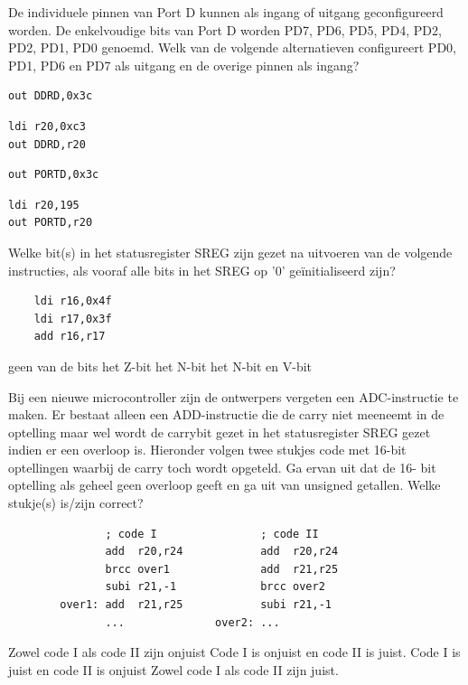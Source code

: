 \documentclass[a4paper,12pt,fleqn,dutch]{tisdexam}
\begin{document}
\begin{questions}
\question
\label{opg:opg5}
De individuele pinnen van Port D kunnen als ingang of uitgang geconfigureerd worden. De
enkelvoudige bits van Port D worden PD7, PD6, PD5, PD4, PD2, PD2, PD1, PD0 genoemd.
Welk van de volgende alternatieven configureert PD0, PD1, PD6 en PD7 als uitgang en de
overige pinnen als ingang?
\begin{choices}
	\choice \begin{verbatim}out DDRD,0x3c\end{verbatim}
	\CorrectChoice \label{ans:opg5} \begin{verbatim}ldi r20,0xc3
out DDRD,r20\end{verbatim}
	\choice \begin{verbatim}out PORTD,0x3c\end{verbatim}
	\choice \begin{verbatim}ldi r20,195
out PORTD,r20\end{verbatim}
\end{choices}


\question
\label{opg:opg6}
Welke bit(s) in het statusregister SREG zijn gezet na uitvoeren van de volgende
instructies, als vooraf alle bits in het SREG op '0' ge\"{i}nitialiseerd zijn?
\begin{verbatim}
    ldi r16,0x4f
    ldi r17,0x3f
    add r16,r17
\end{verbatim}
\begin{choices}
	\choice geen van de bits
	\choice het Z-bit
	\choice het N-bit
	\CorrectChoice \label{ans:opg6} het N-bit en V-bit
\end{choices}


\question
\label{opg:opg7}
Bij een nieuwe microcontroller zijn de ontwerpers vergeten een ADC-instructie te maken. Er
bestaat alleen een ADD-instructie die de carry niet meeneemt in de optelling maar wel wordt de
carrybit gezet in het statusregister SREG gezet indien er een overloop is. Hieronder volgen twee
stukjes code met 16-bit optellingen waarbij de carry toch wordt opgeteld. Ga ervan uit dat de 16-
bit optelling als geheel geen overloop geeft en ga uit van unsigned getallen. Welke stukje(s)
is/zijn correct?
\begin{verbatim}
               ; code I                ; code II
               add  r20,r24            add  r20,r24
               brcc over1              add  r21,r25
               subi r21,-1             brcc over2
        over1: add  r21,r25            subi r21,-1
               ...              over2: ...
\end{verbatim}
\begin{choices}
	\choice Zowel code I als code II zijn onjuist
	\choice Code I is onjuist en code II is juist.
	\CorrectChoice \label{ans:opg7} Code I is juist en code II is onjuist
	\choice Zowel code I als code II zijn juist.
\end{choices}



\end{questions}
\end{document}
